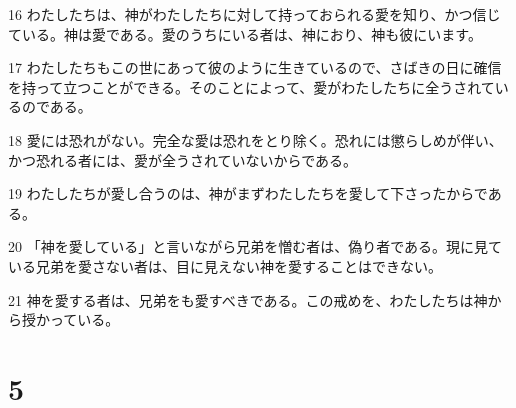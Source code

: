 \par 16 わたしたちは、神がわたしたちに対して持っておられる愛を知り、かつ信じている。神は愛である。愛のうちにいる者は、神におり、神も彼にいます。
\par 17 わたしたちもこの世にあって彼のように生きているので、さばきの日に確信を持って立つことができる。そのことによって、愛がわたしたちに全うされているのである。
\par 18 愛には恐れがない。完全な愛は恐れをとり除く。恐れには懲らしめが伴い、かつ恐れる者には、愛が全うされていないからである。
\par 19 わたしたちが愛し合うのは、神がまずわたしたちを愛して下さったからである。
\par 20 「神を愛している」と言いながら兄弟を憎む者は、偽り者である。現に見ている兄弟を愛さない者は、目に見えない神を愛することはできない。
\par 21 神を愛する者は、兄弟をも愛すべきである。この戒めを、わたしたちは神から授かっている。

\chapter{5}


